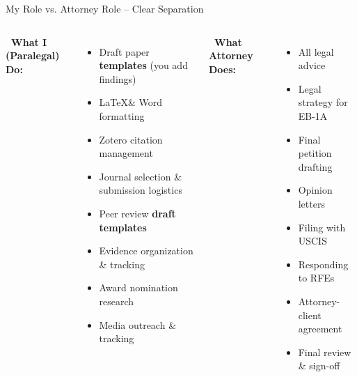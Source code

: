 \documentclass[aspectratio=169, 10pt]{beamer}
\begin{document}
	\begin{frame}{My Role vs. Attorney Role -- Clear Separation}
		\begin{columns}[T]
			\textbf{\faUserGraduate \ What I (Paralegal) Do:}
			\begin{itemize}
				\item Draft paper \textbf{templates} (you add findings)
				\item \LaTeX \& Word formatting
				\item Zotero citation management
				\item Journal selection \& submission logistics
				\item Peer review \textbf{draft templates}
				\item Evidence organization \& tracking
				\item Award nomination research
				\item Media outreach \& tracking
			\end{itemize}
			
			\textbf{\faGavel \ What Attorney Does:}
			\begin{itemize}
				\item All legal advice
				\item Legal strategy for EB-1A
				\item Final petition drafting
				\item Opinion letters
				\item Filing with USCIS
				\item Responding to RFEs
				\item Attorney-client agreement
				\item Final review \& sign-off
			\end{itemize}
		\end{columns}
		
		\vspace{0.3cm}
		\centering
	\end{frame}
	
\end{document}
